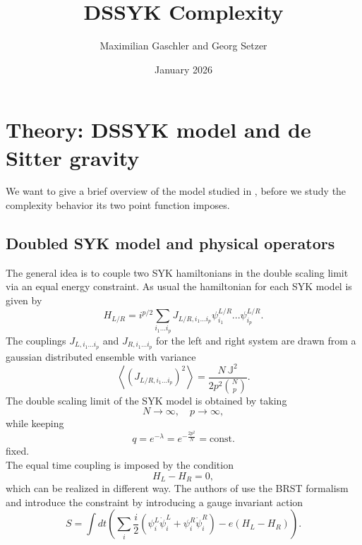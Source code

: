 \documentclass{article}
\title{DSSYK Complexity}
\author{Maximilian Gaschler and Georg Setzer}
\date{January 2026}
\numberwithin{equation}{section}
\begin{document}
\maketitle
\onehalfspacing
\section{Theory: DSSYK model and de Sitter gravity}
We want to give a brief overview of the model studied in \cite{Narovlansky:2023lfz}, before we study the complexity behavior its two point function imposes.
\subsection{Doubled SYK model and physical operators}
The general idea is to couple two SYK hamiltonians in the double scaling limit via an equal energy constraint. As usual the hamiltonian for each SYK model is given by
\begin{equation}
    H_{L/R} = i^{p/2} \sum_{i_1...i_p} J_{L/R, i_1...i_p} \psi^{L/R}_{i_1} ...\psi^{L/R}_{i_p}.
\end{equation}
The couplings $J_{L, i_1...i_p}$ and $J_{R, i_1...i_p}$ for the left and right system are drawn from a gaussian distributed ensemble with variance
\begin{equation}
    \left< (J_{L/R, i_1...i_p})^2 \right> = \frac{N \, \mathbb{J}^2}{2 p^2 \binom{N}{p}}.
\end{equation}
The double scaling limit of the SYK model is obtained by taking
\begin{equation}
    N \rightarrow \infty, \quad p \rightarrow \infty,
\end{equation}
while keeping
\begin{equation}
    q = e^{-\lambda} = e^{-\frac{2 p^2}{N}} = \text{const.}
\end{equation}
fixed. \\
The equal time coupling is imposed by the condition
\begin{equation}
    H_L - H_R = 0,
\end{equation}
which can be realized in different way. The authors of \cite{Narovlansky:2023lfz} use the BRST formalism and introduce the constraint by introducing a gauge invariant action
\begin{equation}
    S = \int dt \left( \sum_i \frac{i}{2}(\psi_i^L \dot{\psi}_i^L + \psi_i^R \dot{\psi}_i^R ) -e(H_L -H_R)\right).
\end{equation}
\end{document}
